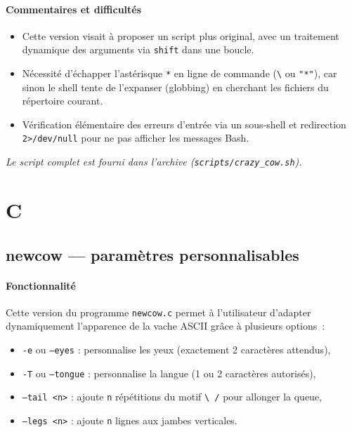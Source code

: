 \documentclass[a4paper,french,11pt]{article}
\begin{document}
\paragraph{Commentaires et difficultés}
\begin{itemize}
  \item Cette version visait à proposer un script plus original, avec un traitement dynamique des arguments via \texttt{shift} dans une boucle.
  \item Nécessité d’échapper l’astérisque \texttt{*} en ligne de commande (\texttt{\textbackslash*} ou \texttt{"*"}), car sinon le shell tente de l’expanser (globbing) en cherchant les fichiers du répertoire courant.
  \item Vérification élémentaire des erreurs d’entrée via un sous-shell et redirection \texttt{2>/dev/null} pour ne pas afficher les messages Bash.
\end{itemize}

\medskip
\noindent\emph{Le script complet est fourni dans l’archive (\texttt{scripts/crazy\_cow.sh}).}

\newpage

\section{C}

\subsection{newcow — paramètres personnalisables}

\paragraph{Fonctionnalité}  
Cette version du programme \texttt{newcow.c} permet à l'utilisateur d'adapter dynamiquement l'apparence de la vache ASCII grâce à plusieurs options :
\begin{itemize}
  \item \texttt{-e} ou \texttt{--eyes} : personnalise les yeux (exactement 2 caractères attendus),
  \item \texttt{-T} ou \texttt{--tongue} : personnalise la langue (1 ou 2 caractères autorisés),
  \item \texttt{--tail <n>} : ajoute \texttt{n} répétitions du motif \verb|\ /| pour allonger la queue,
  \item \texttt{--legs <n>} : ajoute \texttt{n} lignes aux jambes verticales.
\end{itemize}
\end{document}

